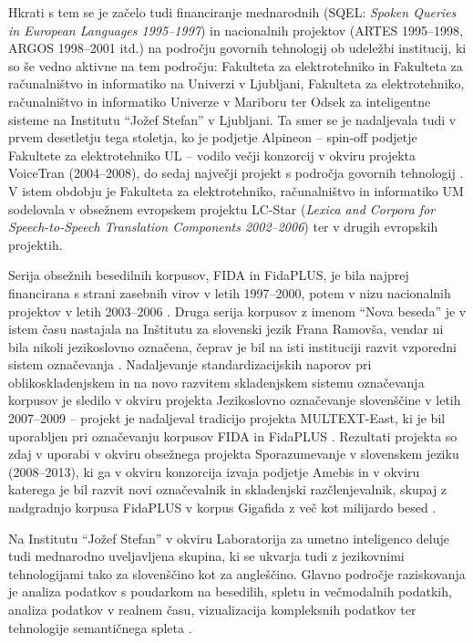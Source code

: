 \begin{multicols}{2}
Hkrati s tem se je začelo tudi financiranje mednarodnih (SQEL: \textit{Spoken Queries in European Languages 1995--1997}) in nacionalnih projektov (ARTES 1995--1998, ARGOS 1998--2001 itd.) na področju govor\-nih tehnologij ob udeležbi institucij, ki so še vedno aktivne na tem področju: Fakulteta za elektrotehniko in Fakulteta za računalništvo in informatiko na Univerzi v Ljubljani, Fakulteta za elektrotehniko, računalništvo in informatiko Univerze v Mariboru ter Odsek za inteligentne sisteme na Institutu “Jožef Stefan” v Ljubljani. Ta smer se je nadaljevala tudi v prvem desetletju tega stoletja, ko je podjetje Alpineon – spin-off podjetje Fakultete za elektrotehniko UL – vodilo večji konzorcij v okviru projekta VoiceTran (2004--2008), do sedaj največji projekt s področja govornih tehnologij \cite{Alp4}. V istem obdobju je Fakulteta za elektrotehniko, računalništvo in informatiko UM sodelovala v obsežnem evropskem projektu LC-Star (\textit{Lexica and Corpora for Speech-to-Speech Translation Components 2002--2006}) ter v drugih evropskih projektih.


Serija obsežnih besedilnih korpusov, FIDA in FidaPLUS, je bila najprej financirana s strani zasebnih virov v letih 1997--2000, potem v nizu nacionalnih projektov v letih 2003--2006 \cite{Fida1}. Druga serija korpusov z imenom “Nova beseda” je v istem času nastajala na Inštitutu za slovenski jezik Frana Ramovša, vendar ni bila nikoli jezikoslovno označena, čeprav je bil na isti instituciji razvit vzporedni sistem označevanja \cite{NB1}.  Nadaljevanje standardizacijskih naporov pri oblikoskladenjskem in na novo razvitem skladenjskem sistemu označevanja korpusov je sledilo v okviru projekta Jezikoslovno označevanje slovenščine v letih 2007--2009 – projekt je nadaljeval tradicijo projekta MULTEXT-East, ki je bil uporabljen pri označevanju korpusov FIDA in FidaPLUS \cite{JOS1}. Rezultati projekta so zdaj v uporabi v okviru obsežnega projekta Sporazumevanje v slovenskem jeziku (2008--2013), ki ga v okviru konzorcija izvaja podjetje Amebis in v okviru katerega je bil razvit novi označevalnik in skladenjski razčlenjevalnik, skupaj z nadgradnjo korpusa FidaPLUS v korpus Gigafida z več kot milijardo besed \cite{Slo1}. 
	
Na Institutu “Jožef Stefan” v okviru Laboratorija za umetno inteligenco deluje tudi mednarodno uveljavljena skupina, ki se ukvarja tudi z jezikov\-nimi tehnologijami tako za slovenščino kot za angleščino. Glavno področje raziskovanja je ana\-liza podatkov s poudarkom na besedilih, spletu in večmodalnih podatkih, analiza podatkov v realnem času, vizualizacija kompleksnih podatkov ter tehnologije semantičnega spleta \cite{Ailab1}. 


\end{multicols}
